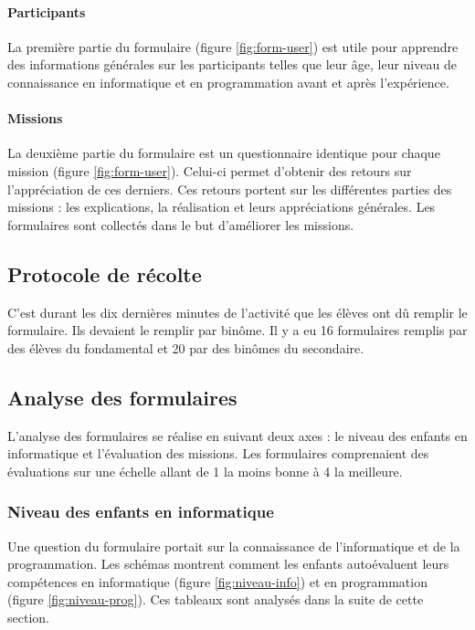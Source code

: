 \paragraph{Participants}
La première partie du formulaire (figure \ref{fig:form-user}) est utile pour apprendre des informations générales sur les participants telles que leur âge, leur niveau de connaissance en informatique et en programmation avant et après l'expérience.

\paragraph{Missions}
La deuxième partie du formulaire est un questionnaire identique pour chaque \gls{mission} (figure \ref{fig:form-user}). Celui-ci permet d'obtenir des retours sur l'appréciation de ces derniers. Ces retours portent sur les différentes parties des \glspl{mission} : les explications, la réalisation et leurs appréciations générales. Les formulaires sont collectés dans le but d'améliorer les \glspl{mission}.

\subsection{Protocole de récolte}
C'est durant les dix dernières minutes de l'activité que les élèves ont dû remplir le formulaire. Ils devaient le remplir par binôme. Il y a eu 16 formulaires remplis par des élèves du \gls{fondamental} et 20 par des binômes du \gls{secondaire}.

\subsection{Analyse des formulaires}
L'analyse des formulaires se réalise en suivant deux axes : le niveau des enfants en informatique et l'évaluation des \glspl{mission}. Les formulaires comprenaient des évaluations sur une échelle allant de 1 la moins bonne à 4 la meilleure.

\subsubsection{Niveau des enfants en informatique}
Une question du formulaire portait sur la connaissance de l'informatique et de la programmation. Les schémas montrent comment les enfants autoévaluent leurs compétences en informatique (figure \ref{fig:niveau-info}) et en programmation (figure \ref{fig:niveau-prog}). Ces tableaux sont analysés dans la suite de cette section.\\

